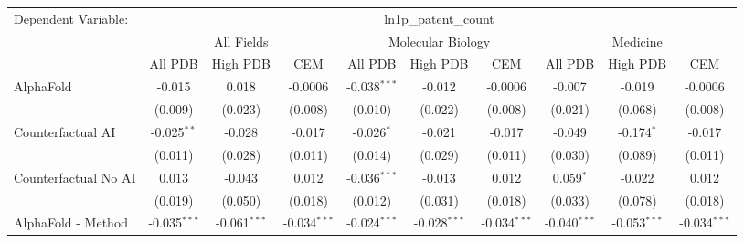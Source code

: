 \begingroup
\centering
\begin{tabular}{lccccccccc}
   \tabularnewline \midrule \midrule
   Dependent Variable: & \multicolumn{9}{c}{ln1p\_patent\_count}\\
 & \multicolumn{3}{c}{All Fields} & \multicolumn{3}{c}{Molecular Biology} & \multicolumn{3}{c}{Medicine} \\
\cmidrule(lr){2-7} \cmidrule(lr){5-10} \cmidrule(lr){8-7}
 & \multicolumn{1}{c}{All PDB} & \multicolumn{1}{c}{High PDB} & \multicolumn{1}{c}{CEM} & \multicolumn{1}{c}{All PDB} & \multicolumn{1}{c}{High PDB} & \multicolumn{1}{c}{CEM} & \multicolumn{1}{c}{All PDB} & \multicolumn{1}{c}{High PDB} & \multicolumn{1}{c}{CEM} \\
\cmidrule(lr){2-3} \cmidrule(lr){3-4} \cmidrule(lr){4-5} \cmidrule(lr){5-6} \cmidrule(lr){6-7} \cmidrule(lr){7-8} \cmidrule(lr){8-9} \cmidrule(lr){9-10} \cmidrule(lr){10-3}
   AlphaFold                                                   & -0.015         & 0.018          & -0.0006        & -0.038$^{***}$ & -0.012         & -0.0006        & -0.007         & -0.019         & -0.0006\\   
                                                               & (0.009)        & (0.023)        & (0.008)        & (0.010)        & (0.022)        & (0.008)        & (0.021)        & (0.068)        & (0.008)\\   
   Counterfactual AI                                           & -0.025$^{**}$  & -0.028         & -0.017         & -0.026$^{*}$   & -0.021         & -0.017         & -0.049         & -0.174$^{*}$   & -0.017\\   
                                                               & (0.011)        & (0.028)        & (0.011)        & (0.014)        & (0.029)        & (0.011)        & (0.030)        & (0.089)        & (0.011)\\   
   Counterfactual No AI                                        & 0.013          & -0.043         & 0.012          & -0.036$^{***}$ & -0.013         & 0.012          & 0.059$^{*}$    & -0.022         & 0.012\\   
                                                               & (0.019)        & (0.050)        & (0.018)        & (0.012)        & (0.031)        & (0.018)        & (0.033)        & (0.078)        & (0.018)\\   
   AlphaFold - Method                                          & -0.035$^{***}$ & -0.061$^{***}$ & -0.034$^{***}$ & -0.024$^{***}$ & -0.028$^{***}$ & -0.034$^{***}$ & -0.040$^{***}$ & -0.053$^{***}$ & -0.034$^{***}$\\   

\end{tabular}
